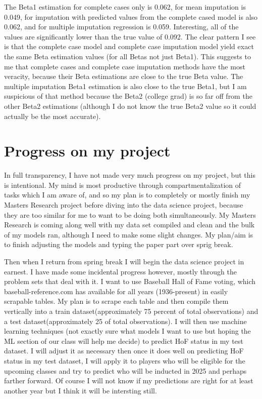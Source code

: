 \documentclass{article}
\begin{document}
The Beta1 estimation for complete cases only is 0.062, for mean imputation is 0.049, for imputation with predicted values from the complete cased model is also 0.062, and for multiple imputation regression is 0.059. Interesting, all of the values are significantly lower than the true value of 0.092. The clear pattern I see is that the complete case model and complete case imputation model yield exact the same Beta estimation values (for all Betas not just Beta1). This suggests to me that complete cases and complete case imputation methods have the most veracity, because their Beta estimations are close to the true Beta value. The multiple imputation Beta1 estimation is also close to the true Beta1, but I am suspicious of that method because the Beta2 (college grad) is so far off from the other Beta2 estimations (although I do not know the true Beta2 value so it could actually be the most accurate). 

\section{Progress on my project}
In full transparency, I have not made very much progress on my project, but this is intentional. My mind is most productive through compartmentalization of tasks which I am aware of, and so my plan is to completely or mostly finish my Masters Research project before diving into the data science project, because they are too similar for me to want to be doing both simultaneously. My Masters Research is coming along well with my data set compiled and clean and the bulk of my models ran, although I need to make some slight changes. My plan/aim is to finish adjusting the models and typing the paper part over sprig break. 

Then when I return from spring break I will begin the data science project in earnest. I have made some incidental progress however, mostly through the problem sets that deal with it. I want to use Baseball Hall of Fame voting, which baseball-reference.com has available for all years (1936-present) in easily scrapable tables. My plan is to scrape each table and then compile them vertically into a train dataset(approximately 75 percent of total observations) and a test dataset(approximately 25 of total observations). I will then use machine learning techniques (not exactly sure what models I want to use but hoping the ML section of our class will help me decide) to predict HoF status in my test dataset. I will adjust it as necessary then once it does well on predicting HoF status in my test dataset, I will apply it to players who will be eligible for the upcoming classes and try to predict who will be inducted in 2025 and perhaps farther forward. Of course I will not know if my predictions are right for at least another year but I think it will be intersting still.
\end{document}
